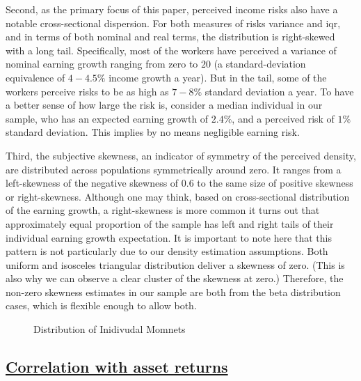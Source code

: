 \documentclass[12pt,notitlepage,onecolumn,aps,pra]{revtex4-1}
\begin{document}
Second, as the primary focus of this paper, perceived income risks also
have a notable cross-sectional dispersion. For both measures of risks
variance and iqr, and in terms of both nominal and real terms, the
distribution is right-skewed with a long tail. Specifically, most of the
workers have perceived a variance of nominal earning growth ranging from
zero to \(20\) (a standard-deviation equivalence of \(4-4.5\%\) income
growth a year). But in the tail, some of the workers perceive risks to
be as high as \(7-8\%\) standard deviation a year. To have a better
sense of how large the risk is, consider a median individual in our
sample, who has an expected earning growth of \(2.4\%\), and a perceived
risk of \(1\%\) standard deviation. This implies by no means negligible
earning risk.

Third, the subjective skewness, an indicator of symmetry of the
perceived density, are distributed across populations symmetrically
around zero. It ranges from a left-skewness of the negative skewness of
0.6 to the same size of positive skewness or right-skewness. Although
one may think, based on cross-sectional distribution of the earning
growth, a right-skewness is more common it turns out that approximately
equal proportion of the sample has left and right tails of their
individual earning growth expectation. It is important to note here that
this pattern is not particularly due to our density estimation
assumptions. Both uniform and isosceles triangular distribution deliver
a skewness of zero. (This is also why we can observe a clear cluster of
the skewness at zero.) Therefore, the non-zero skewness estimates in our
sample are both from the beta distribution cases, which is flexible
enough to allow both.


    \begin{figure}
        \begin{center}\end{center}
        \caption{Distribution of Inidivudal Momnets}
        \label{fig:histmoms}
    \end{figure}
    
    \hypertarget{correlation-with-asset-returns}{%
\subsection{\texorpdfstring{\href{MacroRiskProfile.ipynb}{Correlation
with asset
returns}}{Correlation with asset returns}}\label{correlation-with-asset-returns}}
\end{document}
